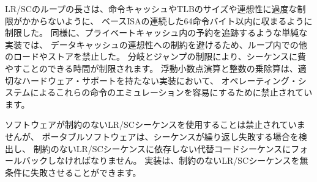 \begin{commentary}
\begin{comment}
We restricted the length of LR/SC loops to fit within 64 contiguous
instruction bytes in the base ISA to avoid undue restrictions on instruction
cache and TLB size and associativity.
Similarly, we disallowed other loads and stores within the loops to avoid
restrictions on data-cache associativity in simple implementations that track
the reservation within a private cache.
The restrictions on branches and jumps limit the time that
can be spent in the sequence.  Floating-point operations and integer
multiply/divide were disallowed to simplify the operating system's emulation
of these instructions on implementations lacking appropriate hardware support.
\end{comment}

LR/SCのループの長さは、命令キャッシュやTLBのサイズや連想性に過度な制限がかからないように、
ベースISAの連続した64命令バイト以内に収まるように制限した。
同様に、プライベートキャッシュ内の予約を追跡するような単純な実装では、
データキャッシュの連想性への制約を避けるため、ループ内での他のロードやストアを禁止した。
分岐とジャンプの制限により、シーケンスに費やすことのできる時間が制限されます。
浮動小数点演算と整数の乗除算は、適切なハードウェア・サポートを持たない実装において、
オペレーティング・システムによるこれらの命令のエミュレーションを容易にするために禁止されています。

\begin{comment}
Software is not forbidden from using unconstrained LR/SC sequences, but
portable software must detect the case that the sequence repeatedly fails,
then fall back to an alternate code sequence that does not rely on an
unconstrained LR/SC sequence.  Implementations are permitted to
unconditionally fail any unconstrained LR/SC sequence.
\end{comment}

ソフトウェアが制約のないLR/SCシーケンスを使用することは禁止されていませんが、
ポータブルソフトウェアは、シーケンスが繰り返し失敗する場合を検出し、
制約のないLR/SCシーケンスに依存しない代替コードシーケンスにフォールバックしなければなりません。
実装は、制約のないLR/SCシーケンスを無条件に失敗させることができます。
\end{commentary}

